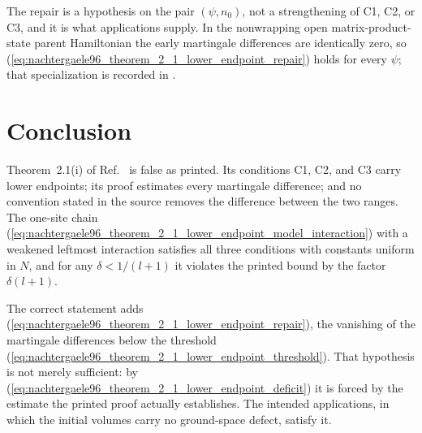 \documentclass{article}
\begin{document}
The repair is a hypothesis on the pair $(\psi,n_0)$, not a strengthening of
C1, C2, or C3, and it is what applications supply. In the nonwrapping open
matrix-product-state parent Hamiltonian the early martingale differences are
identically zero, so
(\ref{eq:nachtergaele96_theorem_2_1_lower_endpoint_repair}) holds for every
$\psi$; that specialization is recorded in
.

\section{Conclusion}

Theorem~2.1(i) of Ref.~\cite{Nachtergaele1996Spectral} is false as printed.
Its conditions C1, C2, and C3 carry lower endpoints; its proof estimates every
martingale difference; and no convention stated in the source removes the
difference between the two ranges. The one-site chain
(\ref{eq:nachtergaele96_theorem_2_1_lower_endpoint_model_interaction}) with a
weakened leftmost interaction satisfies all three conditions with constants
uniform in $N$, and for any $\delta<1/(l+1)$ it violates the printed bound by
the factor $\delta(l+1)$.

The correct statement adds
(\ref{eq:nachtergaele96_theorem_2_1_lower_endpoint_repair}), the vanishing of
the martingale differences below the threshold
(\ref{eq:nachtergaele96_theorem_2_1_lower_endpoint_threshold}). That
hypothesis is not merely sufficient: by
(\ref{eq:nachtergaele96_theorem_2_1_lower_endpoint_deficit}) it is forced by
the estimate the printed proof actually establishes. The intended
applications, in which the initial volumes carry no ground-space defect,
satisfy it.



\end{document}
